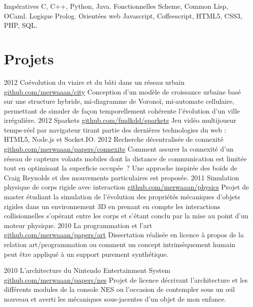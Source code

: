 \documentclass[]{friggeri-cv}
\begin{document}
\begin{entrylist}
  \entry
    {}
    {Impératives}
    {}
    {C, C++, Python, Java.}
  \entry
    {}
    {Fonctionnelles}
    {}
    {Scheme, Common Lisp, OCaml.}
  \entry
    {}
    {Logique}
    {}
    {Prolog.}
  \entry
    {}
    {Orientées web}
    {}
    {Javascript, Coffeescript, HTML5, CSS3, PHP, SQL.}
\end{entrylist}

\section{Projets}

\begin{entrylist}
  \entry
    {2012}
    {Coévolution du viaire et du bâti dans un réseau urbain}
    {\href{http://github.com/merwaaan/city}{github.com/merwaaan/city}}
    {Conception d'un modèle de croissance urbaine basé sur une structure
      hybride, mi-diagramme de Voronoï, mi-automate cellulaire, permettant
      de simuler de façon temporellement cohérente l'évolution d'un ville 
      irrégulière.}
  \entry
    {2012}
    {Sparkets}
    {\href{http://github.com/fmdkdd/sparkets}{github.com/fmdkdd/sparkets}}
    {Jeu vidéo multijoueur temps-réel par navigateur tirant partie des
      dernières technologies du web : HTML5, Node.js et Socket.IO.}
  \entry
    {2012}
    {Recherche décentralisée de connexité}
    {\href{https://github.com/merwaaan/papers/blob/master/connexite/rapport.pdf?raw=true}{github.com/merwaaan/papers/connexite}}
    {Comment assurer la connexité d'un réseau de capteurs volants
      mobiles dont la distance de communication est limitée tout en
      optimisant la superficie occupée~? Une approche inspirée des
      boïds de Craig Reynolds et des mouvements particulaires est
      proposée.}
  \entry
    {2011}
    {Simulation physique de corps rigide avec interaction}
    {\href{http://github.com/merwaaan/physics}{github.com/merwaaan/physics}}
    {Projet de master étudiant la simulation de l'évolution des
      propriétés mécaniques d'objets rigides dans un environnement 3D
      en prenant en compte les interactions collisionnelles s'opérant
      entre les corps et s'étant conclu par la mise au point d'un
      moteur physique.}
  \entry
    {2010}
    {La programmation et l'art}
    {\href{http://github.com/merwaaan/papers/blob/master/art/progart.pdf?raw=true}{github.com/merwaaan/papers/art}}
    {Dissertation réalisée en licence à propos de la relation
      art/programmation ou comment un concept intrinsèquement humain
      peut être appliqué à un support purement synthétique.}

  \entry
    {2010}
    {L'architecture du Nintendo Entertainment System}
    {\href{https://github.com/merwaaan/papers/blob/master/nes/archines.pdf?raw=true}{github.com/merwaaan/papers/nes}}
    {Projet de licence décrivant l'architecture et les différents
      modules de la console NES ou l'occasion de contempler sous un
      \oe il nouveau et averti les mécaniques sous-jacentes d'un objet
      de mon enfance.}

\end{entrylist}
\end{document}
